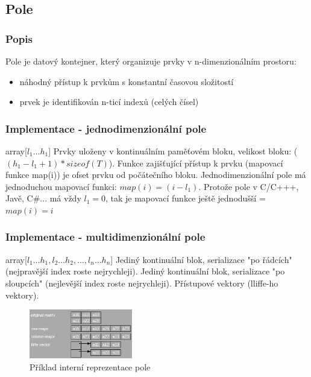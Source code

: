 \documentclass{szzclass}
\begin{document}
\subsection{Pole}
\subsubsection{Popis}
Pole je datový kontejner, který organizuje prvky v n-dimenzionálním prostoru:
\begin{itemize}
    \item náhodný přístup k prvkům s konstantní časovou složitostí
    \item prvek je identifikován n-ticí indexů (celých čísel)
\end{itemize}
\subsubsection{Implementace - jednodimenzionální pole}
array[$l_1 \dots h_1$]
\newline
Prvky uloženy v kontinuálním paměťovém bloku, velikost bloku: ($(h_1 - l_1 + 1) * sizeof(T)$). Funkce zajišťující přístup k prvku (mapovací funkce map(i))
je ofset prvku od počátečního bloku.
\newline
Jednodimenzionální pole má jednoduchou mapovací funkci: $map(i) = (i - l_1)$. Protože pole v C/C+++, Javě, C\#... má vždy $ l_1 = 0 $, tak je mapovací
funkce ještě jednodušší = $map(i) = i$
\subsubsection{Implementace - multidimenzionální pole}
array[$l_1 \dots h_1,l_2 \dots h_2,\dots,l_n \dots h_n$]
\newline
Jediný kontinuální blok, serializace "po řádcích" (nejpravější index roste nejrychleji).
Jediný kontinuální blok, serializace "po sloupcích" (nejlevější index roste nejrychleji).
Přístupové vektory (lliffe-ho vektory).
\begin{figure}[h!]
    \centering
    \includegraphics[width=0.4\textwidth]{topics/bi-spol-22/images/multidimensionalArray.png}
    \caption{Příklad interní reprezentace pole}
\end{figure}
\end{document}
